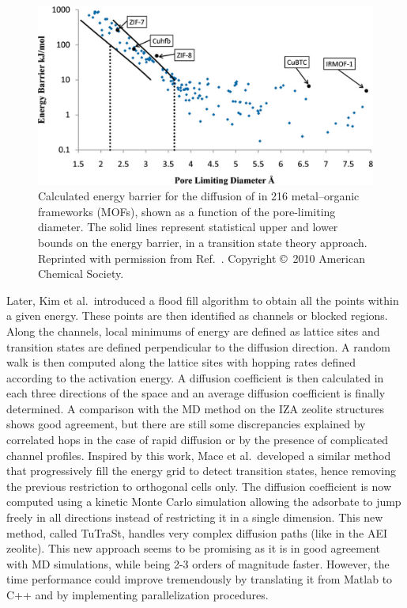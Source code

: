 \documentclass[main.tex]{subfiles}
\begin{document}
\begin{figure}[ht]
\centering
  \includegraphics[width=0.7\linewidth]{figures/1-screening/Haldoupis_2010.jpeg}
  \caption{Calculated energy barrier for the diffusion of  in 216 metal--organic frameworks (MOFs), shown as a function of the pore-limiting diameter. The solid lines represent statistical upper and lower bounds on the energy barrier, in a transition state theory approach. Reprinted with permission from Ref.~\cite{Haldoupis_2010}. Copyright \copyright\  2010 American Chemical Society.}\label{fgr:Haldoupis_2010}
\end{figure}

Later, Kim et al.\ introduced a flood fill algorithm to obtain all the points within a given energy.\autocite{Kim_2013} These points are then identified as channels or blocked regions. Along the channels, local minimums of energy are defined as lattice sites and transition states are defined perpendicular to the diffusion direction. A random walk is then computed along the lattice sites with hopping rates defined according to the activation energy. A diffusion coefficient is then calculated in each three directions of the space and an average diffusion coefficient is finally determined.
A comparison with the MD method on the IZA zeolite structures shows good agreement, but there are still some discrepancies explained by correlated hops in the case of rapid diffusion or by the presence of complicated channel profiles. Inspired by this work, Mace et al.\ developed a similar method that progressively fill the energy grid to detect transition states, hence removing the previous restriction to orthogonal cells only.\autocite{Mace_2019} The diffusion coefficient is now computed using a kinetic Monte Carlo simulation allowing the adsorbate to jump freely in all directions instead of restricting it in a single dimension. This new method, called TuTraSt, handles very complex diffusion paths (like in the AEI zeolite). This new approach seems to be promising as it is in good agreement with MD simulations, while being 2-3 orders of magnitude faster. However, the time performance could improve tremendously by translating it from Matlab to C++ and by implementing parallelization procedures.
\end{document}
